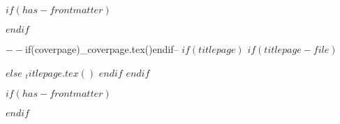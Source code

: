 $if(has-frontmatter)$
  \begin{frontmatter}
$endif$

\begin{titlepage}
$-- %
$if(coverpage)$
$_coverpage.tex()$
$endif$

$-- %
$if(titlepage)$
$if(titlepage-file)$

$else$
$_titlepage.tex()$
$endif$
$endif$
\end{titlepage}
\setcounter{page}{1}
$if(has-frontmatter)$
\end{frontmatter}
$endif$

